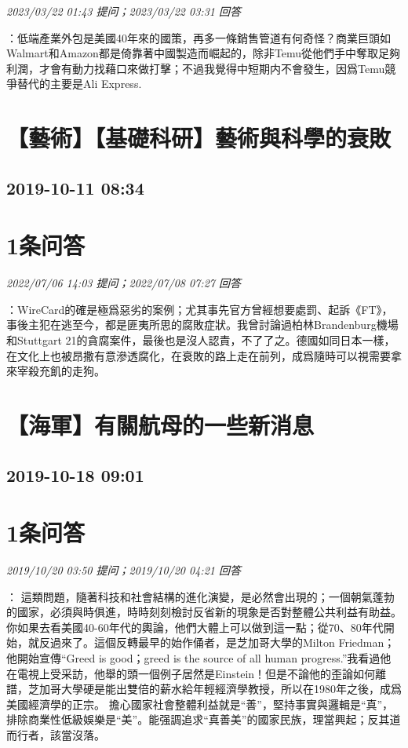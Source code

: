 \documentclass[twocolumn]{ctexart}
\begin{document}
\textit{\hfill\noindent\small 2023/03/22 01:43 提问；2023/03/22 03:31 回答}

：低端產業外包是美國40年來的國策，再多一條銷售管道有何奇怪？商業巨頭如Walmart和Amazon都是倚靠著中國製造而崛起的，除非Temu從他們手中奪取足夠利潤，才會有動力找藉口來做打擊；不過我覺得中短期内不會發生，因爲Temu競爭替代的主要是Ali Express.
\\


\section{【藝術】【基礎科研】藝術與科學的衰敗}
\subsection{2019-10-11 08:34}


\section{1条问答}

\textit{\hfill\noindent\small 2022/07/06 14:03 提问；2022/07/08 07:27 回答}

：WireCard的確是極爲惡劣的案例；尤其事先官方曾經想要處罰、起訴《FT》，事後主犯在逃至今，都是匪夷所思的腐敗症狀。我曾討論過柏林Brandenburg機場和Stuttgart 21的貪腐案件，最後也是沒人認責，不了了之。德國如同日本一樣，在文化上也被昂撒有意滲透腐化，在衰敗的路上走在前列，成爲隨時可以視需要拿來宰殺充飢的走狗。
\\


\section{【海軍】有關航母的一些新消息}
\subsection{2019-10-18 09:01}


\section{1条问答}

\textit{\hfill\noindent\small 2019/10/20 03:50 提问；2019/10/20 04:21 回答}

：
這類問題，隨著科技和社會結構的進化演變，是必然會出現的；一個朝氣蓬勃的國家，必須與時俱進，時時刻刻檢討反省新的現象是否對整體公共利益有助益。你如果去看美國40-60年代的輿論，他們大體上可以做到這一點；從70、80年代開始，就反過來了。這個反轉最早的始作俑者，是芝加哥大學的Milton Friedman；他開始宣傳“Greed is good；greed is the source of all human progress.”我看過他在電視上受采訪，他舉的頭一個例子居然是Einstein！但是不論他的歪論如何離譜，芝加哥大學硬是能出雙倍的薪水給年輕經濟學教授，所以在1980年之後，成爲美國經濟學的正宗。
擔心國家社會整體利益就是“善”，堅持事實與邏輯是“真”，排除商業性低級娛樂是“美”。能强調追求“真善美”的國家民族，理當興起；反其道而行者，該當沒落。
\\
\end{document}
